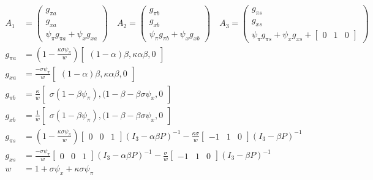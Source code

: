 \documentclass[11pt]{article}
\renewcommand{\[}{\begin{equation}}
\renewcommand{\]}{\end{equation}}
\begin{document}
 \begin{align}
A_1 & = \begin{pmatrix} g_{\pi a} \\ g_{x a} \\ \psi_{\pi}g_{\pi a} + \psi_xg_{x a}
\end{pmatrix}
\quad A_2 = \begin{pmatrix} g_{\pi b} \\ g_{x b} \\ \psi_{\pi}g_{\pi b} + \psi_xg_{x b}
\end{pmatrix}
 \quad A_3 = \begin{pmatrix} g_{\pi s} \\ g_{x s} \\ \psi_{\pi}g_{\pi s} + \psi_xg_{x s} + \begin{bmatrix} 0 & 1& 0\end{bmatrix}
\end{pmatrix} \\
g_{\pi a} & =(1-\frac{\kappa\sigma\psi_{\pi}}{w} )  \begin{bmatrix}(1-\alpha)\beta, \kappa\alpha\beta, 0 \end{bmatrix} \\
g_{x a} & =  \frac{-\sigma\psi_{\pi}}{w} \begin{bmatrix}(1-\alpha)\beta, \kappa\alpha\beta, 0 \end{bmatrix}\\
g_{\pi b} & = \frac{\kappa}{w} \begin{bmatrix}\sigma(1-\beta\psi_{\pi}), (1-\beta-\beta\sigma\psi_x, 0 \end{bmatrix}\\
g_{x b} & = \frac{1}{w} \begin{bmatrix}\sigma(1-\beta\psi_{\pi}), (1-\beta-\beta\sigma\psi_x, 0 \end{bmatrix} \\
g_{\pi s} & = (1-\frac{\kappa\sigma\psi_{\pi}}{w} )\begin{bmatrix} 0&0&1 \end{bmatrix} (I_3 - \alpha\beta P)^{-1} -\frac{\kappa\sigma}{w}\begin{bmatrix} -1&1&0 \end{bmatrix} (I_3 -\beta P)^{-1}\\
g_{x s} & =  \frac{-\sigma\psi_{\pi}}{w} \begin{bmatrix} 0&0&1 \end{bmatrix}(I_3 - \alpha\beta P)^{-1}  -\frac{\sigma}{w}\begin{bmatrix} -1&1&0 \end{bmatrix}(I_3 -\beta P)^{-1}\\
w & = 1+\sigma\psi_x +\kappa\sigma\psi_{\pi}
\end{align}
\end{document}
